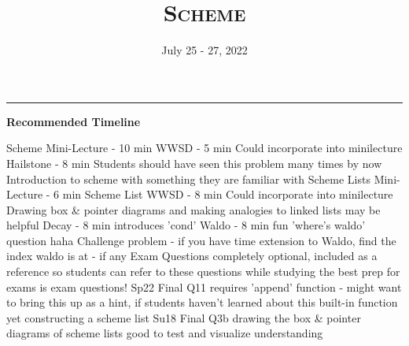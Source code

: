 \documentclass{exam}
\title{\textsc{Scheme}}
\date{July 25 - 27, 2022}
\begin{document}
\maketitle
\rule{\textwidth}{0.15em}
\fontsize{12}{15}\selectfont

\begin{guide}
\begin{blocksection}
\textbf{Recommended Timeline}
\begin{outline}[enumerate]
  \1 Scheme Mini-Lecture - 10 min
  \1 WWSD - 5 min
  \2 Could incorporate into minilecture
  \1 Hailstone - 8 min
  \2 Students should have seen this problem many times by now
  \2 Introduction to scheme with something they are familiar with
  \1 Scheme Lists Mini-Lecture - 6 min
  \1 Scheme List WWSD - 8 min
  \2 Could incorporate into minilecture
  \2 Drawing box \& pointer diagrams and making analogies to linked lists may be helpful
  \1 Decay - 8 min
  \2 introduces 'cond'
  \1 Waldo - 8 min
  \2 fun 'where's waldo' question haha
  \1 Challenge problem - if you have time
  \2 extension to Waldo, find the index waldo is at - if any
  \1 Exam Questions
  \2 completely optional, included as a reference so students can refer to these questions while studying
  \2 the best prep for exams is exam questions!
  \2 Sp22 Final Q11
  \3 requires 'append' function - might want to bring this up as a hint, if students haven't learned about this built-in function yet
  \3 constructing a scheme list
  \2 Su18 Final Q3b
  \3 drawing the box \& pointer diagrams of scheme lists
  \3 good to test and visualize understanding
\end{outline}
\end{blocksection}
\end{guide}
\end{document}
